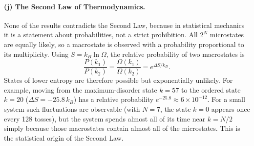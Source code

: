 \paragraph{(j) The Second Law of Thermodynamics.}
None of the results contradicts the Second Law, because in statistical
mechanics it is a statement about probabilities, not a strict prohibition.
All $2^{N}$ microstates are equally likely, so a macrostate is observed with a
probability proportional to its multiplicity. Using $S=k_B\ln\Omega$, the
relative probability of two macrostates is
\begin{equation}
  \frac{P(k_1)}{P(k_2)}=\frac{\Omega(k_1)}{\Omega(k_2)}=e^{\Delta S/k_B}.
\end{equation}
States of lower entropy are therefore possible but exponentially unlikely.
For example, moving from the maximum-disorder state $k=57$ to the ordered
state $k=20$ ($\Delta S=-25.8\,k_B$) has a relative probability
$e^{-25.8}\approx6\times10^{-12}$. For a small system such fluctuations are
observable (with $N=7$, the state $k=0$ appears once every 128 tosses), but
the system spends almost all of its time near $k=N/2$ simply because those
macrostates contain almost all of the microstates. This is the statistical
origin of the Second Law.

